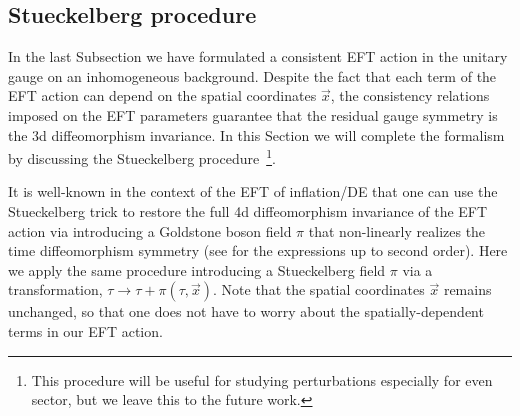 \documentclass[a4paper,11pt]{article}
\numberwithin{equation}{section}
\begin{document}
\subsection{Stueckelberg procedure}
In the last Subsection we have formulated a consistent EFT action in the unitary gauge on an inhomogeneous background. Despite the fact that each term of the EFT action can depend on the spatial coordinates $\vec{x}$, the consistency relations imposed on the EFT parameters guarantee that the residual gauge symmetry is the 3d diffeomorphism invariance. In this Section we will complete the formalism by discussing the Stueckelberg procedure~\footnote{This procedure will be useful for studying perturbations especially for even sector, but we leave this to the future work.}. 

It is well-known in the context of the EFT of inflation/DE \cite{Cheung:2007st,Gubitosi:2012hu} that one can use the Stueckelberg trick to restore the full 4d diffeomorphism invariance of the EFT action via introducing a Goldstone boson field $\pi$ that non-linearly realizes the time diffeomorphism symmetry (see \cite{Cusin:2017mzw} for the expressions up to second order).  Here we apply the same procedure introducing a Stueckelberg field $\pi$ via a transformation, $\tau \rightarrow \tau + \pi(\tau,\vec{x})$. Note that the spatial coordinates $\vec{x}$ remains unchanged, so that one does not have to worry about the spatially-dependent terms in our EFT action. 
\end{document}
